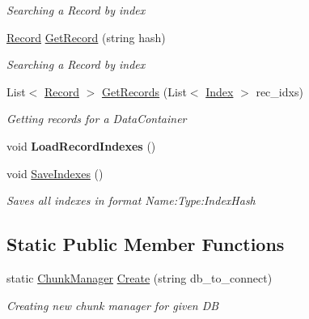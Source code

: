 \begin{DoxyCompactItemize}
\begin{DoxyCompactList}\small\item\em Searching a Record by index \end{DoxyCompactList}\item 
\hyperlink{class_dwarf_d_b_1_1_data_structures_1_1_record}{Record} \hyperlink{class_dwarf_d_b_1_1_chunk_manager_1_1_chunk_manager_a12bbf90b25cfa5ee7861e20ef6319710}{Get\+Record} (string hash)
\begin{DoxyCompactList}\small\item\em Searching a Record by index \end{DoxyCompactList}\item 
List$<$ \hyperlink{class_dwarf_d_b_1_1_data_structures_1_1_record}{Record} $>$ \hyperlink{class_dwarf_d_b_1_1_chunk_manager_1_1_chunk_manager_a037839674d8248cade1ea666c9200d9f}{Get\+Records} (List$<$ \hyperlink{class_dwarf_d_b_1_1_data_structures_1_1_index}{Index} $>$ rec\+\_\+idxs)
\begin{DoxyCompactList}\small\item\em Getting records for a Data\+Container \end{DoxyCompactList}\item 
\hypertarget{class_dwarf_d_b_1_1_chunk_manager_1_1_chunk_manager_a80aab988ea4c69f7abcfcd2015623a9c}{void {\bfseries Load\+Record\+Indexes} ()}\label{class_dwarf_d_b_1_1_chunk_manager_1_1_chunk_manager_a80aab988ea4c69f7abcfcd2015623a9c}

\item 
void \hyperlink{class_dwarf_d_b_1_1_chunk_manager_1_1_chunk_manager_af8099b5fa9a87264defdb4687e9851b0}{Save\+Indexes} ()
\begin{DoxyCompactList}\small\item\em Saves all indexes in format Name\+:\+Type\+:Index\+Hash \end{DoxyCompactList}\end{DoxyCompactItemize}
\subsection*{Static Public Member Functions}
\begin{DoxyCompactItemize}
\item 
static \hyperlink{class_dwarf_d_b_1_1_chunk_manager_1_1_chunk_manager}{Chunk\+Manager} \hyperlink{class_dwarf_d_b_1_1_chunk_manager_1_1_chunk_manager_ac75fd758d8a6f1579eb15ac3f398c1ea}{Create} (string db\+\_\+to\+\_\+connect)
\begin{DoxyCompactList}\small\item\em Creating new chunk manager for given D\+B \end{DoxyCompactList}\end{DoxyCompactItemize}
